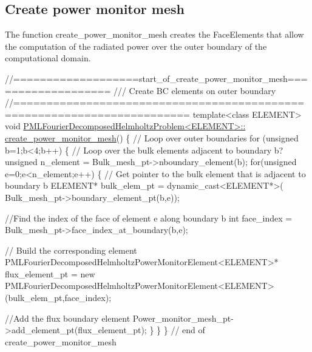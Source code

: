 \hypertarget{index_p_monitor}{}\subsection{Create power monitor mesh}\label{index_p_monitor}
The function {\ttfamily create\+\_\+power\+\_\+monitor\+\_\+mesh} creates the Face\+Elements that allow the computation of the radiated power over the outer boundary of the computational domain.

 
\begin{DoxyCodeInclude}
\textcolor{comment}{//===================start\_of\_create\_power\_monitor\_mesh===================}
\textcolor{comment}{/// Create BC elements on outer boundary}
\textcolor{comment}{}\textcolor{comment}{//========================================================================}
\textcolor{keyword}{template}<\textcolor{keyword}{class} ELEMENT>
\textcolor{keywordtype}{void} \hyperlink{classPMLFourierDecomposedHelmholtzProblem_a83e0aa333ec3b25f1afccc3bc0a529ad}{PMLFourierDecomposedHelmholtzProblem<ELEMENT>::}
\hyperlink{classPMLFourierDecomposedHelmholtzProblem_a83e0aa333ec3b25f1afccc3bc0a529ad}{create\_power\_monitor\_mesh}()
\{
 \textcolor{comment}{// Loop over outer boundaries}
 \textcolor{keywordflow}{for} (\textcolor{keywordtype}{unsigned} b=1;b<4;b++)
  \{
   \textcolor{comment}{// Loop over the bulk elements adjacent to boundary b?}
   \textcolor{keywordtype}{unsigned} n\_element = Bulk\_mesh\_pt->nboundary\_element(b);
   \textcolor{keywordflow}{for}(\textcolor{keywordtype}{unsigned} e=0;e<n\_element;e++)
    \{
     \textcolor{comment}{// Get pointer to the bulk element that is adjacent to boundary b}
     ELEMENT* bulk\_elem\_pt = \textcolor{keyword}{dynamic\_cast<}ELEMENT*\textcolor{keyword}{>}(
      Bulk\_mesh\_pt->boundary\_element\_pt(b,e));

     \textcolor{comment}{//Find the index of the face of element e along boundary b}
     \textcolor{keywordtype}{int} face\_index = Bulk\_mesh\_pt->face\_index\_at\_boundary(b,e);

     \textcolor{comment}{// Build the corresponding element}
     PMLFourierDecomposedHelmholtzPowerMonitorElement<ELEMENT>*
      flux\_element\_pt = \textcolor{keyword}{new}
      PMLFourierDecomposedHelmholtzPowerMonitorElement<ELEMENT>
      (bulk\_elem\_pt,face\_index);

     \textcolor{comment}{//Add the flux boundary element}
     Power\_monitor\_mesh\_pt->add\_element\_pt(flux\_element\_pt);
    \}
  \}
\} \textcolor{comment}{// end of create\_power\_monitor\_mesh}

\end{DoxyCodeInclude}




